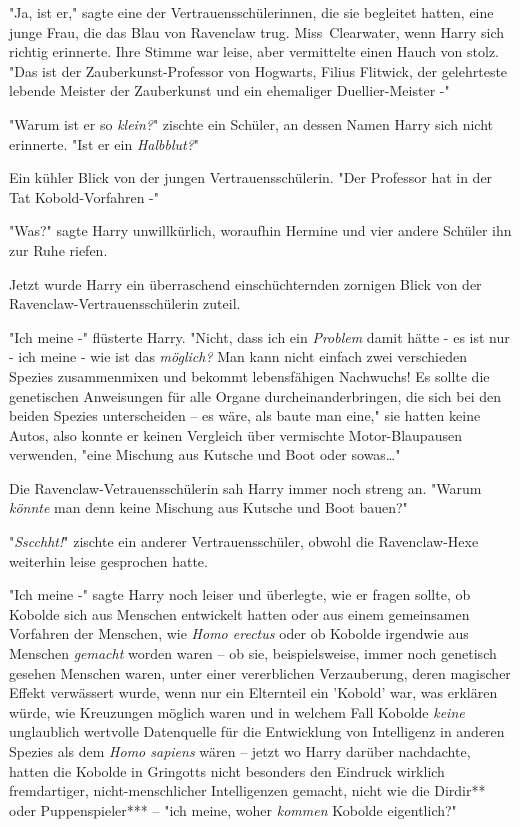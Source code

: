 {"Ja, ist er," sagte eine der Vertrauensschülerinnen, die sie begleitet hatten, eine junge Frau, die das Blau von Ravenclaw trug. Miss~Clearwater, wenn Harry sich richtig erinnerte. Ihre Stimme war leise, aber vermittelte einen Hauch von stolz. "Das ist der Zauberkunst-Professor von Hogwarts, Filius Flitwick, der gelehrteste lebende Meister der Zauberkunst und ein ehemaliger Duellier-Meister -"

"Warum ist er so \emph{klein?}" zischte ein Schüler, an dessen Namen Harry sich nicht erinnerte. "Ist er ein \emph{Halbblut?}"

Ein kühler Blick von der jungen Vertrauensschülerin. "Der Professor hat in der Tat Kobold-Vorfahren -"

"Was?" sagte Harry unwillkürlich, woraufhin Hermine und vier andere Schüler ihn zur Ruhe riefen.

Jetzt wurde Harry ein überraschend einschüchternden zornigen Blick von der Ravenclaw-Vertrauensschülerin zuteil.

"Ich meine -" flüsterte Harry. "Nicht, dass ich ein \emph{Problem} damit hätte - es ist nur - ich meine - wie ist das \emph{möglich?} Man kann nicht einfach zwei verschieden Spezies zusammenmixen und bekommt lebensfähigen Nachwuchs! Es sollte die genetischen Anweisungen für alle Organe durcheinanderbringen, die sich bei den beiden Spezies unterscheiden -- es wäre, als baute man eine," sie hatten keine Autos, also konnte er keinen Vergleich über vermischte Motor-Blaupausen verwenden, "eine Mischung aus Kutsche und Boot oder sowas…"

Die Ravenclaw-Vetrauensschülerin sah Harry immer noch streng an. "Warum \emph{könnte} man denn keine Mischung aus Kutsche und Boot bauen?"

"\emph{Sscchht!}" zischte ein anderer Vertrauensschüler, obwohl die Ravenclaw-Hexe weiterhin leise gesprochen hatte.

"Ich meine -" sagte Harry noch leiser und überlegte, wie er fragen sollte, ob Kobolde sich aus Menschen entwickelt hatten oder aus einem gemeinsamen Vorfahren der Menschen, wie \emph{Homo erectus} oder ob Kobolde irgendwie aus Menschen \emph{gemacht} worden waren -- ob sie, beispielsweise, immer noch genetisch gesehen Menschen waren, unter einer vererblichen Verzauberung, deren magischer Effekt verwässert wurde, wenn nur ein Elternteil ein 'Kobold' war, was erklären würde, wie Kreuzungen möglich waren und in welchem Fall Kobolde \emph{keine} unglaublich wertvolle Datenquelle für die Entwicklung von Intelligenz in anderen Spezies als dem \emph{Homo sapiens} wären -- jetzt wo Harry darüber nachdachte, hatten die Kobolde in Gringotts nicht besonders den Eindruck wirklich fremdartiger, nicht-menschlicher Intelligenzen gemacht, nicht wie die Dirdir** oder Puppenspieler*** -- "ich meine, woher \emph{kommen} Kobolde eigentlich?"

}
